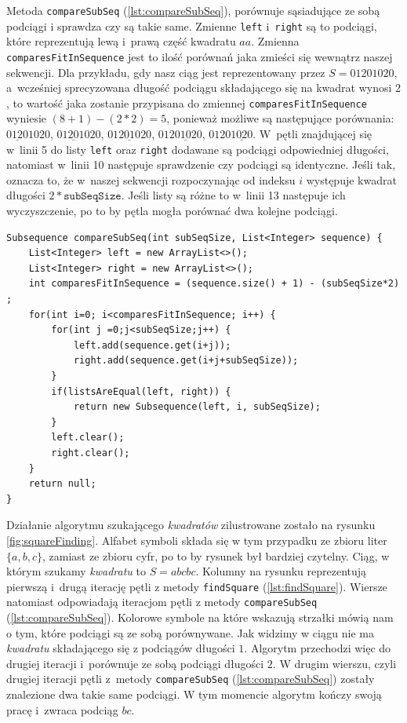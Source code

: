 \documentclass[document]{xmgr}
\begin{document}
Metoda \texttt{compareSubSeq} (\ref{lst:compareSubSeq}), porównuje sąsiadujące ze sobą podciągi i sprawdza czy są takie same. Zmienne \texttt{left} i~\texttt{right} są to podciągi, które reprezentują lewą i~prawą część kwadratu $aa$. Zmienna \texttt{comparesFitInSequence} jest to ilość porównań jaka zmieści się wewnątrz naszej sekwencji. Dla przykładu, gdy nasz ciąg jest reprezentowany przez $S=01201020$, a~wcześniej sprecyzowana długość podciągu składającego się na kwadrat wynosi $2$, to wartość jaka zostanie przypisana do zmiennej \mbox{\texttt{comparesFitInSequence}} wyniesie $(8 + 1) - (2 * 2)=5$, ponieważ możliwe są następujące porównania: $\underline{0120}1020$, $0\underline{1201}020$, $01\underline{2010}20$, $012\underline{0102}0$, $0120\underline{1020}$. W~pętli znajdującej się w~linii 5 do lis\-ty \texttt{left} oraz \mbox{\texttt{right}} dodawane są podciągi odpowiedniej długości, natomiast w~linii 10 następuje sprawdzenie czy podciągi są identyczne. Jeśli tak, oznacza to, że w~naszej sekwencji rozpoczynając od indeksu $i$ występuje kwadrat długości $2 * \texttt{subSeqSize}$. Jeśli listy są różne to w~linii 13 następuje ich wyczyszczenie, po to by pętla mogła porównać dwa kolejne podciągi.

\begin{lstlisting}[caption={Metoda pomocnicza przy szukaniu \emph{kwadratów} wewnątrz listy.},label=lst:compareSubSeq]
Subsequence compareSubSeq(int subSeqSize, List<Integer> sequence) {
	List<Integer> left = new ArrayList<>();
	List<Integer> right = new ArrayList<>();
	int comparesFitInSequence = (sequence.size() + 1) - (subSeqSize*2) ;
	for(int i=0; i<comparesFitInSequence; i++) {
		for(int j =0;j<subSeqSize;j++) {
			left.add(sequence.get(i+j));
			right.add(sequence.get(i+j+subSeqSize));
		}
		if(listsAreEqual(left, right)) {
			return new Subsequence(left, i, subSeqSize);
		}
		left.clear();
		right.clear();
	}
	return null;
}
\end{lstlisting}

Działanie algorytmu szukającego \emph{kwadratów} zilustrowane zostało na rysunku \ref{fig:squareFinding}. Alfabet symboli składa się w tym przypadku ze zbioru liter $\{a, b, c\}$, zamiast ze zbioru cyfr, po to by rysunek był bardziej czytelny. Ciąg, w którym szukamy \emph{kwadratu} to $S=abcbc$. Kolumny na rysunku reprezentują pierwszą i~drugą iterację pętli z metody \texttt{findSquare} (\ref{lst:findSquare}). Wiersze natomiast odpowiadają iteracjom pętli z metody \texttt{compareSubSeq} (\ref{lst:compareSubSeq}). Kolorowe symbole na które wskazują strzałki mówią nam o tym, które podciągi są ze sobą porównywane. Jak widzimy w ciągu nie ma \emph{kwadratu} składającego się z podciągów długości $1$. Algorytm przechodzi więc do drugiej iteracji i~porównuje ze sobą podciągi długości $2$. W drugim wierszu, czyli drugiej iteracji pętli z~metody \texttt{compareSubSeq} (\ref{lst:compareSubSeq}) zostały znalezione dwa takie same podciągi. W tym momencie algorytm kończy swoją pracę i~zwraca podciąg $bc$.
\end{document}
